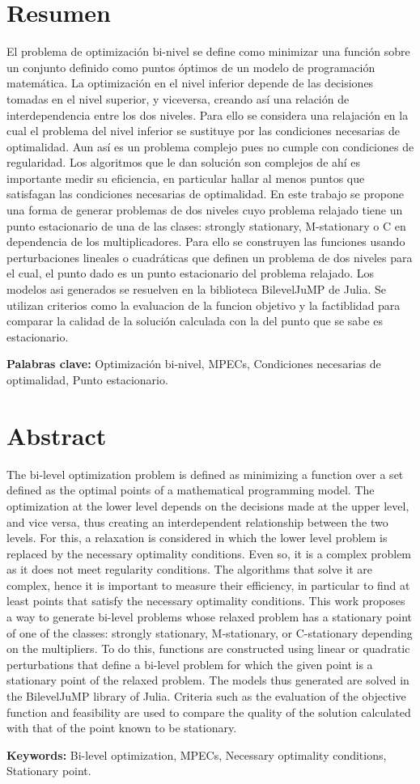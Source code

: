 \chapter*{Resumen}
El problema de optimización bi-nivel se define como minimizar una función sobre un conjunto definido como puntos óptimos de un modelo de programación matemática. La optimización en el nivel inferior depende de las decisiones tomadas en el nivel superior, y viceversa, creando así una relación de interdependencia entre los dos niveles.
Para ello se considera una relajación en la cual el problema del nivel inferior se sustituye por las condiciones necesarias de optimalidad. Aun así es un problema complejo pues no cumple con condiciones de regularidad. Los algoritmos que le dan solución son complejos de ahí es importante medir su eficiencia, en particular hallar al menos puntos que satisfagan las condiciones necesarias de optimalidad.
En este trabajo se propone una forma de generar problemas de dos niveles cuyo problema relajado tiene un punto estacionario de una de las clases: strongly stationary, M-stationary o C en dependencia de los multiplicadores.
Para ello se construyen las funciones usando perturbaciones lineales o cuadráticas que definen un problema de dos niveles para el cual, el punto dado es un punto estacionario del problema relajado. Los modelos asi generados se resuelven en la biblioteca BilevelJuMP de Julia. Se utilizan criterios como la evaluacion de la funcion objetivo y la factiblidad para comparar la calidad de la solución  calculada con la del punto que se sabe es estacionario.

\textbf{Palabras clave:} Optimización bi-nivel, MPECs, Condiciones necesarias de optimalidad, Punto estacionario.

\chapter*{Abstract}
The bi-level optimization problem is defined as minimizing a function over a set defined as the optimal points of a mathematical programming model. The optimization at the lower level depends on the decisions made at the upper level, and vice versa, thus creating an interdependent relationship between the two levels.
For this, a relaxation is considered in which the lower level problem is replaced by the necessary optimality conditions. Even so, it is a complex problem as it does not meet regularity conditions. The algorithms that solve it are complex, hence it is important to measure their efficiency, in particular to find at least points that satisfy the necessary optimality conditions.
This work proposes a way to generate bi-level problems whose relaxed problem has a stationary point of one of the classes: strongly stationary, M-stationary, or C-stationary depending on the multipliers.
To do this, functions are constructed using linear or quadratic perturbations that define a bi-level problem for which the given point is a stationary point of the relaxed problem. The models thus generated are solved in the BilevelJuMP library of Julia. Criteria such as the evaluation of the objective function and feasibility are used to compare the quality of the solution calculated with that of the point known to be stationary.

\textbf{Keywords:} Bi-level optimization, MPECs, Necessary optimality conditions, Stationary point.
